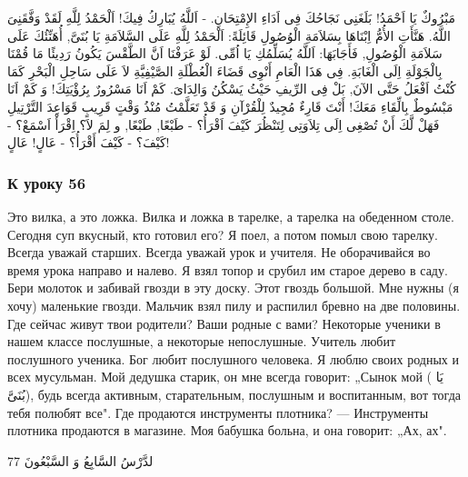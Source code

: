 \documentclass[a5paper]{article}
\begin{document}
مَبْرُوكٌ يَا اَحْمَدُ! بَلَغَنِى نَجَاحُكَ فِى اَدَاءِ الإِمْتِحَانِ. - اَللَّهُ يُبَارِكُ فِيكَ! اَلْحَمْدُ لِلَّهِ لَقَدْ وَفَّقَنِىَ اللَّهُ. هَنَّأَتِ الأُمُّ اِبْنَاهَا بِسَلاَمَةِ الْوُصُولِ قَائِلَةً: اَلْحَمْدُ لِلَّهِ عَلَى السَّلاَمَةِ يَا بُنَىَّ, أُهَنِّئُكَ عَلَى سَلاَمَةِ الْوُصُولِ, فَأَجَابَهَا: اَللَّهُ يُسَلِّمُكِ يَا اُمِّى. لَوْ عَرَفْنَا اَنَّ الطَّقْسَ يَكُونُ رَدِيئًا مَا قُمْنَا بِالْجَوْلَةِ اِلَى الْغَابَةِ. فِى هَذَا الْعَامِ أَنْوِى قَضَاءَ الْعُطْلَةِ الصَّيْفِيَّةِ لاَ عَلَى سَاحِلِ الْبَحْرِ كَمَا كُنْتُ اَفْعَلُ حَتَّى الآنَ, بَلْ فِى الرِّيفِ حَيْثُ يَسْكُنُ وَالِدَاىَ. كَمْ اَنَا مَسْرُورٌ بِرُؤْيَتِكَ! وَ كَمْ اَنَا مَبْسُوطٌ بِالِّقَاءِ مَعَكَ! أَنْتَ قَارِءٌ مُجِيدٌ لِلْقُرْآنِ وَ قَدْ تَعَلَّمْتُ مُنْذُ وَقْتٍ قَرِيبٍ قَوَاعِدَ التَّرْتِيلِ فَهَلْ لَّكَ أَنْ تُصْغِى اِلَى تِلاَوَتِى لِتَنْظُرَ كَيْفَ اَقْرَأُ؟ - طَبْعًا, طَبْعًا, و لِمَ لاَ؟ اِقْرَأْ اَسْمَعْ؟ - كَيْفَ؟ - كَيْفَ أَقْرَأُ؟ - عَالٍ! عَالٍ! 

\subsubsection{К уроку 56}
Это вилка, а это ложка. Вилка и ложка в тарелке, а тарелка на обеденном столе. Сегодня суп вкусный, кто готовил его? Я поел, а потом помыл свою тарелку. Всегда уважай старших. Всегда уважай урок и учителя. Не оборачивайся во время урока направо и налево. Я взял топор и срубил им старое дерево в саду. Бери молоток и забивай гвозди в эту доску. Этот гвоздь большой. Мне нужны (я хочу) маленькие гвозди. Мальчик взял пилу и распилил бревно на две половины. Где сейчас живут твои родители? Ваши родные с вами? Некоторые ученики в нашем классе послушные, а некоторые непослушные. Учитель любит послушного ученика. Бог любит послушного человека. Я люблю своих родных и всех мусульман. Мой дедушка старик, он мне всегда говорит: „Сынок мой ( يَا بُنَىَّ), будь всегда активным, старательным, послушным и воспитанным, вот тогда тебя полюбят все". Где продаются инструменты плотника? — Инструменты плотника продаются в магазине. Моя бабушка больна, и она говорит: „Ах, ах".

لدَّرْسُ السَّابِعُ وَ السَّبْعُونَ 77
\end{document}
